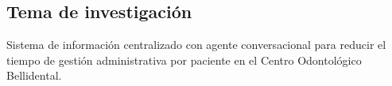 \subsection{Tema de investigación}


Sistema de información centralizado con agente conversacional para reducir el tiempo de gestión administrativa por paciente en el Centro Odontológico Bellidental.
